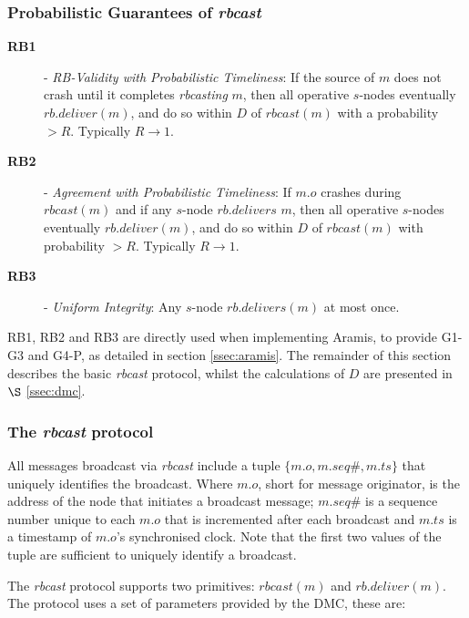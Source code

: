     \subsubsection*{Probabilistic Guarantees of \emph{rbcast}}
    
    \begin{description}
		    \item [\textbf{RB1}] - \emph{RB-Validity with Probabilistic Timeliness}: If the source of $m$ does not crash until it completes \emph{rbcasting} $m$, then all operative $s$-nodes eventually $rb.deliver(m)$, and do so within $D$ of  $rbcast(m)$ with a probability $> R$.  Typically $R \rightarrow 1$.
		    
		    \item [\textbf{RB2}] - \emph{Agreement with Probabilistic Timeliness}: If $m.o$ crashes during $rbcast(m)$ and if any $s$-node $rb.delivers$ $m$, then all operative $s$-nodes eventually $rb.deliver(m)$, and do so within $D$ of $rbcast(m)$ with probability $> R$. Typically $R \rightarrow 1$.
		
		    \item [\textbf{RB3}] - \emph{Uniform Integrity}: Any $s$-node $rb.delivers(m)$ at most once.  
    \end{description}
    
    RB1, RB2 and RB3 are directly used when implementing \textsf{Aramis}, to provide G1-G3 and G4-P, as detailed in section \ref{ssec:aramis}.  The remainder of this section describes the basic \emph{rbcast} protocol, whilst the calculations of $D$ are presented in $\S$ \ref{ssec:dmc}.
    
    \subsubsection*{The \emph{rbcast} protocol}
    All messages broadcast via \emph{rbcast} include a tuple $\{m.o, m.seq\#, m.ts\}$ that uniquely identifies the broadcast.  Where $m.o$, short for message originator, is the address of the node that initiates a broadcast message; $m.seq\#$ is a sequence number unique to each $m.o$ that is incremented after each broadcast and $m.ts$ is a timestamp of $m.o$'s synchronised clock.  Note that the first two values of the tuple are sufficient to uniquely identify a broadcast.
    
    The \emph{rbcast} protocol supports two primitives: $rbcast(m)$ and $rb.deliver(m)$.  The protocol uses a set of parameters provided by the DMC, these are:
    
